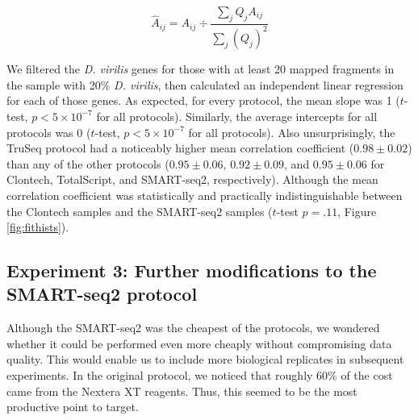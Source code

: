 \begin{equation} \label{eqn:norm}
\hat{A}_{ij} = A_{ij} \div \frac{\sum_j Q_j A_{ij}}{\sum_j (Q_j)^2}  
\end{equation}



We filtered the {\em D. virilis} genes for those with at least 20 mapped fragments in the sample with 20\% {\em D. virilis}, then calculated an independent linear regression for each of those genes.  As expected, for every protocol, the mean slope was 1 ($t$-test, $p<5\times10^{-7}$ for all protocols).  Similarly, the average intercepts for all protocols was 0 ($t$-test, $p<5\times10^{-7}$ for all protocols).  Also unsurprisingly, the TruSeq protocol had a noticeably higher mean correlation coefficient ($0.98 \pm 0.02$) than any of the other protocols ($0.95 \pm 0.06$, $0.92\pm0.09$, and $0.95 \pm 0.06$ for Clontech, TotalScript, and SMART-seq2, respectively). Although the mean correlation coefficient was statistically and practically indistinguishable between the Clontech samples and the SMART-seq2 samples ($t$-test $p = .11$, Figure \ref{fig:fithists}).


\subsection{Experiment 3: Further modifications to the SMART-seq2 protocol}

Although the SMART-seq2 was the cheapest of the protocols, we wondered whether it could be performed even more cheaply without compromising data quality.  This would enable us to include more biological replicates in subsequent experiments.  In the original protocol, we noticed that roughly 60\% of the cost came from the Nextera XT reagents.  Thus, this seemed to be the most productive point to target.  

